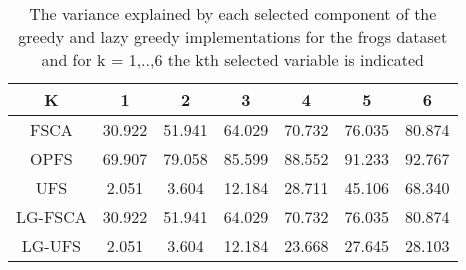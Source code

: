 \begin{table}
	\begin{center}
		\begin{tabular}{c c c c c c c}
			K & 1 & 2 & 3 & 4 & 5 & 6 \\
			\hline
			FSCA & 30.922 & 51.941 & 64.029 & 70.732 & 76.035 & 80.874 \\
			OPFS & 69.907 & 79.058 & 85.599 & 88.552 & 91.233 & 92.767 \\
			UFS & 2.051 & 3.604 & 12.184 & 28.711 & 45.106 & 68.340 \\
			LG-FSCA & 30.922 & 51.941 & 64.029 & 70.732 & 76.035 & 80.874 \\
			LG-UFS & 2.051 & 3.604 & 12.184 & 23.668 & 27.645 & 28.103 \\
		\end{tabular}
	\end{center}
	\caption{The variance explained by each selected component of the greedy and lazy greedy implementations for the frogs dataset and for k = 1,..,6 the kth selected variable is indicated}
\end{table}